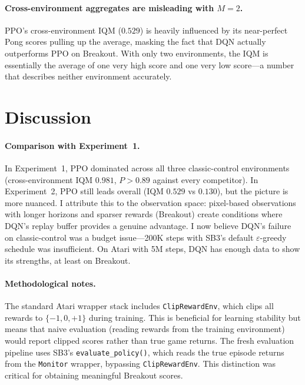 \paragraph{Cross-environment aggregates are misleading with $M = 2$.}
PPO's cross-environment IQM ($0.529$) is heavily influenced by its
near-perfect Pong scores pulling up the average, masking the fact
that DQN actually outperforms PPO on Breakout. With only two
environments, the IQM is essentially the average of one very high
score and one very low score---a number that describes neither
environment accurately.

\section{Discussion}
\label{sec:atari-discussion}

\paragraph{Comparison with Experiment~1.}
In Experiment~1, PPO dominated across all three classic-control
environments (cross-environment IQM $0.981$, $P > 0.89$ against
every competitor). In Experiment~2, PPO still leads overall (IQM
$0.529$ vs $0.130$), but the picture is more nuanced. I attribute
this to the observation space: pixel-based observations with
longer horizons and sparser rewards (Breakout) create conditions
where DQN's replay buffer provides a genuine advantage. I now
believe DQN's failure on classic-control was a budget issue---200K
steps with SB3's default $\varepsilon$-greedy schedule was
insufficient. On Atari with 5M steps, DQN has enough data to show
its strengths, at least on Breakout.

\paragraph{Methodological notes.}
The standard Atari wrapper stack includes \texttt{ClipRewardEnv},
which clips all rewards to $\{-1, 0, +1\}$ during training. This
is beneficial for learning stability but means that naive evaluation
(reading rewards from the training environment) would report clipped
scores rather than true game returns. The fresh evaluation pipeline
uses SB3's \texttt{evaluate\_policy()}, which reads the true episode
returns from the \texttt{Monitor} wrapper, bypassing
\texttt{ClipRewardEnv}. This distinction was critical for obtaining
meaningful Breakout scores.

